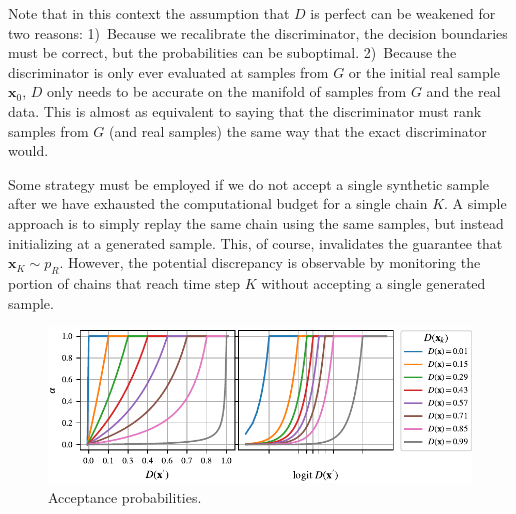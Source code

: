 \documentclass{article}
\renewcommand{\vec}[1]{{\boldsymbol{\mathbf{#1}}}} %
\newcommand{\sample}{\sim}
\newcommand{\PR}{{p_R}}
\begin{document}
Note that in this context the assumption that $D$ is perfect can be weakened for two reasons:
1)~Because we recalibrate the discriminator, the decision boundaries must be correct, but the probabilities can be suboptimal.
2)~Because the discriminator is only ever evaluated at samples from $G$ or the initial real sample $\vec x_0$, $D$ only needs to be accurate on the manifold of samples from $G$ and the real data.
This is almost as equivalent to saying that the discriminator must rank samples from $G$ (and real samples) the same way that the exact discriminator would.

Some strategy must be employed if we do not accept a single synthetic sample after we have exhausted the computational budget for a single chain $K$.
A simple approach is to simply replay the same chain using the same samples, but instead initializing at a generated sample.
This, of course, invalidates the guarantee that $\vec x_K \sample \PR$.
However, the potential discrepancy is observable by monitoring the portion of chains that reach time step $K$ without accepting a single generated sample.


\begin{figure}
    \centering
    \includegraphics[width=\textwidth]{figures/alpha2.pdf}
    \caption{{\small
    Acceptance probabilities.
    }}
    \label{fig:alpha}
\end{figure}

\end{document}
